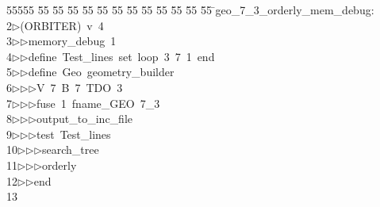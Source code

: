 %
%
\begin{tabbing}
55555 \= 55 \= 55 \= 55 \= 55 \= 55 \= 55 \= 55 \= 55 \= 55 \= 55 \= 55 \= 55 \= \>geo\_7\_3\_orderly\_mem\_debug:\\[0pt]
2\>$\triangleright$\>(ORBITER)\ v\ 4\ \\[0pt]
3\>$\triangleright$\>$\triangleright$\>memory\_debug\ 1\ \\[0pt]
4\>$\triangleright$\>$\triangleright$\>define\ Test\_lines\ set\ loop\ 3\ 7\ 1\ end\ \\[0pt]
5\>$\triangleright$\>$\triangleright$\>define\ Geo\ geometry\_builder\ \\[0pt]
6\>$\triangleright$\>$\triangleright$\>$\triangleright$\>V\ 7\ B\ 7\ TDO\ 3\ \\[0pt]
7\>$\triangleright$\>$\triangleright$\>$\triangleright$\>fuse\ 1\ fname\_GEO\ 7\_3\ \\[0pt]
8\>$\triangleright$\>$\triangleright$\>$\triangleright$\>output\_to\_inc\_file\ \\[0pt]
9\>$\triangleright$\>$\triangleright$\>$\triangleright$\>test\ Test\_lines\ \\[0pt]
10\>$\triangleright$\>$\triangleright$\>$\triangleright$\>search\_tree\ \\[0pt]
11\>$\triangleright$\>$\triangleright$\>$\triangleright$\>orderly\ \\[0pt]
12\>$\triangleright$\>$\triangleright$\>end\\[0pt]
13\>\end{tabbing}
